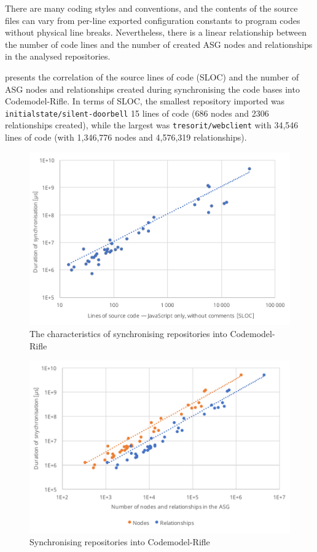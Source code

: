 There are many coding styles and conventions, and the contents of the source files can vary from per-line exported configuration constants to program codes without physical line breaks. Nevertheless, there is a linear relationship between the number of code lines and the number of created ASG nodes and relationships in the analysed repositories.

 presents the correlation of the source lines of code (SLOC) and the number of ASG nodes and relationships created during synchronising the code bases into Codemodel-Rifle. In terms of SLOC, the smallest repository imported was \lstinline{initialstate/silent-doorbell} 15 lines of code (686 nodes and 2306 relationships created), while the largest was \lstinline{tresorit/webclient} with 34,546 lines of code (with 1,346,776 nodes and 4,576,319 relationships).


\begin{figure}[!htb]
	\centerfloat
	\includegraphics[width=\textwidth,clip]{figures/measurement-synctime-sloc.pdf}
	\caption{The characteristics of synchronising repositories into Codemodel-Rifle}
	\label{fig:measurement-synctime-sloc}
\end{figure}

\begin{figure}[!htb]
	\centerfloat
	\includegraphics[width=\textwidth,clip]{figures/measurement-synctime-nodes-relationships.pdf}
	\caption{Synchronising repositories into Codemodel-Rifle}
	\label{fig:measurement-synctime-nodes-relationships}
\end{figure}


